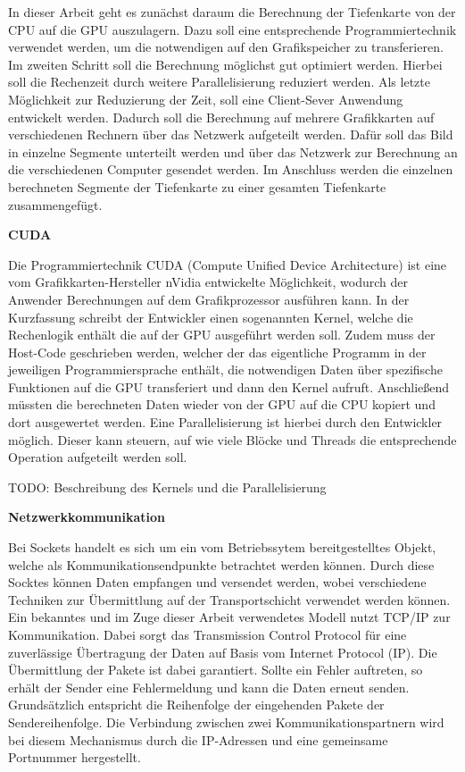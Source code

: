 \documentclass[times, 10pt,twocolumn]{article}
\begin{document}

In dieser Arbeit geht es zunächst daraum die Berechnung der Tiefenkarte von der CPU auf die GPU auszulagern. Dazu soll eine entsprechende Programmiertechnik verwendet werden, um die notwendigen auf den Grafikspeicher zu transferieren. Im zweiten Schritt soll die Berechnung möglichst gut optimiert werden. Hierbei soll die Rechenzeit durch weitere Parallelisierung reduziert werden.
Als letzte Möglichkeit zur Reduzierung der Zeit, soll eine Client-Sever Anwendung entwickelt werden. Dadurch soll die Berechnung auf mehrere Grafikkarten auf verschiedenen Rechnern über das Netzwerk aufgeteilt werden. Dafür soll das Bild in einzelne Segmente unterteilt werden und über das Netzwerk zur Berechnung an die verschiedenen Computer gesendet werden. Im Anschluss werden die einzelnen berechneten Segmente der Tiefenkarte zu einer gesamten Tiefenkarte zusammengefügt.

\textbf{CUDA}

Die Programmiertechnik CUDA (Compute Unified Device Architecture) ist eine vom Grafikkarten-Hersteller nVidia entwickelte Möglichkeit, wodurch der Anwender Berechnungen auf dem Grafikprozessor ausführen kann. 
In der Kurzfassung schreibt der Entwickler einen sogenannten Kernel, welche die Rechenlogik enthält die auf der GPU ausgeführt werden soll. Zudem muss der Host-Code geschrieben werden, welcher der das eigentliche Programm in der jeweiligen Programmiersprache enthält, die notwendigen Daten über spezifische Funktionen auf die GPU transferiert und dann den Kernel aufruft. Anschließend müssten die berechneten Daten wieder von der GPU auf die CPU kopiert und dort ausgewertet werden.
Eine Parallelisierung ist hierbei durch den Entwickler möglich. Dieser kann steuern, auf wie viele Blöcke und Threads die entsprechende Operation aufgeteilt werden soll.

TODO: Beschreibung des Kernels und die Parallelisierung


\textbf{Netzwerkkommunikation}

Bei Sockets handelt es sich um ein vom Betriebssytem bereitgestelltes Objekt, welche als Kommunikationsendpunkte betrachtet werden können. Durch diese Socktes können Daten empfangen und versendet werden, wobei verschiedene Techniken zur Übermittlung auf der Transportschicht verwendet werden können.
Ein bekanntes und im Zuge dieser Arbeit verwendetes Modell nutzt TCP/IP zur Kommunikation. Dabei sorgt das Transmission Control Protocol für eine zuverlässige Übertragung der Daten auf Basis vom Internet Protocol (IP). Die Übermittlung der Pakete ist dabei garantiert. Sollte ein Fehler auftreten, so erhält der Sender eine Fehlermeldung und kann die Daten erneut senden. Grundsätzlich entspricht die Reihenfolge der eingehenden Pakete der Sendereihenfolge.
Die Verbindung zwischen zwei Kommunikationspartnern wird bei diesem Mechanismus durch die IP-Adressen und eine gemeinsame Portnummer hergestellt.
\end{document}
